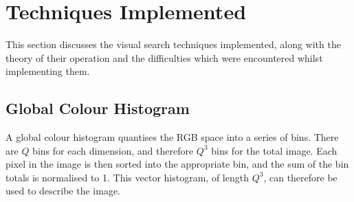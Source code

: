 \section{Techniques Implemented} \label{sec:techniques-implemented}
This section discusses the visual search techniques implemented, along with the theory of their operation and the difficulties which were encountered whilst implementing them.
\subsection{Global Colour Histogram} \label{sec:color-histogram}
A global colour histogram quantises the RGB space into a series of bins. There are $Q$ bins for each dimension, and therefore $Q^3$ bins for the total image. Each pixel in the image is then sorted into the appropriate bin, and the sum of the bin totals is normalised to 1. This vector histogram, of length $Q^3$, can therefore be used to describe the image.

